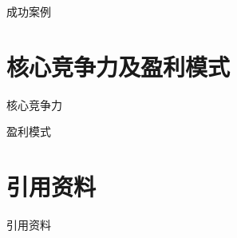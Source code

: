 \documentclass[10pt]{ctexbeamer}
\begin{document}
\begin{frame}{成功案例}
  
   
\end{frame}

\section{核心竞争力及盈利模式}

\begin{frame}[fragile]{核心竞争力}

   
\end{frame}

\begin{frame}{盈利模式}
   
\end{frame}

\section{引用资料}

\begin{frame}[allowframebreaks]{引用资料}

   \printbibliography[heading=none]
 
\end{frame}
\end{document}
